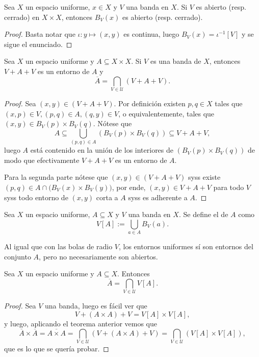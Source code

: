 \documentclass[topologia-analisis.tex]{subfiles}
\begin{document}
\begin{prop}
	Sea $X$ un espacio uniforme, $x \in X$ y $V$ una banda en $X$.
	Si $V$ es abierto (resp. cerrado) en $X\times X$, entonces $B_V(x)$ es abierto (resp. cerrado).
\end{prop}
\begin{proof}
	Basta notar que $\iota\colon y \mapsto (x, y)$ es continua, luego $B_V(x) = \iota^{-1}[V]$ y se sigue el enunciado.
\end{proof}

\begin{thm}\label{thm:entourage_neighborhood}
	Sea $X$ un espacio uniforme y $A \subseteq X\times X$.
	Si $V$ es una banda de $X$, entonces $V + A + V$ es un entorno de $A$ y
	$$ \overline A = \bigcap_{V \in \mathcal{U}} (V + A + V). $$
\end{thm}
\begin{proof}
	Sea $(x, y) \in (V + A + V)$. Por definición existen $p, q \in X$ tales que $(x, p) \in V, (p, q) \in A, (q, y) \in V$, o equivalentemente,
	tales que $(x, y) \in B_V(p) \times B_V(q)$. Nótese que
	$$ A \subseteq \bigcup_{(p, q) \in A} (B_V(p) \times B_V(q)) \subseteq V + A + V, $$
	luego $A$ está contenido en la unión de los interiores de $( B_V(p) \times B_V(q) )$ de modo que efectivamente $V + A + V$ es un entorno de $A$.
	\par
	Para la segunda parte nótese que $(x, y) \in (V + A + V)$ syss existe $(p, q) \in A \cap \big( B_V(x) \times B_V(y) \big)$,
	por ende, $(x, y) \in V+A+V$ para todo $V$ syss todo entorno de $(x, y)$ corta a $A$ syss es adherente a $A$.
\end{proof}

\begin{mydef}
	Sea $X$ un espacio uniforme, $A \subseteq X$ y $V$ una banda en $X$.
	Se define el  de $A$ como
	$$ V[A] := \bigcup_{a\in A} B_V(a). $$
\end{mydef}
Al igual que con las bolas de radio $V$, los entornos uniformes sí son entornos del conjunto $A$, pero no necesariamente son abiertos.

\begin{prop}
	Sea $X$ un espacio uniforme y $A \subseteq X$. Entonces
	$$ \overline A = \bigcap_{V \in \mathcal{U}} V[A]. $$
\end{prop}
\begin{proof}
	Sea $V$ una banda, luego es fácil ver que
	$$ V + (A\times A) + V = V[A] \times V[A], $$
	y luego, aplicando el teorema anterior vemos que
	$$ \overline A \times \overline A = \overline{A \times A} = \bigcap_{V \in \mathcal{U}} (V + (A\times A) + V)
	= \bigcap_{V \in \mathcal{U}} (V[A] \times V[A]), $$
	que es lo que se quería probar.
\end{proof}
\end{document}
